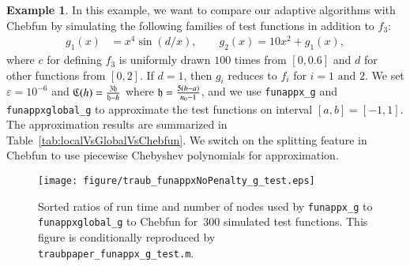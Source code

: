 \documentclass[review]{elsarticle}
\newcommand{\abstol}{\varepsilon}
\theoremstyle{definition}
\newtheorem{exmp}{Example}
\newcommand{\funappxg}{\texttt{funappx\_g}\xspace}
\newcommand{\funappxglobalg}{\texttt{funappxglobal\_g\xspace}}
\begin{document}
\begin{exmp}
In this example, we want to compare our adaptive algorithms with Chebfun by
simulating the following families of test functions in addition to $f_3$:
%
\begin{align*}
 g_1(x) &= x^4 \sin(d/x), \qquad
 g_2(x) = 10  x^2 + g_1(x),
\end{align*}
where $c$ for defining $f_3$ is uniformly drawn $100$ times from $[0,0.6]$ and
$d$ for other functions from $[0,2]$. If $d=1$, then  $g_i$ reduces to $f_i$ for
$i=1 \mbox{ and } 2$. 
We set $\abstol = 10^{-6}$ and $\mathfrak{C}
(h) = \frac{ 3 \mathfrak{h}}{\mathfrak{h}-h}$ where $\mathfrak{h} = \frac{5(b-a)}{n_0-1}$, and we use
\texttt{funappx\_g} and \texttt{funappxglobal\_g} to approximate the test
functions on interval $[a,b]=[-1,1]$. The approximation results are
summarized in Table~\ref{tab:localVsGlobalVsChebfun}. We switch on the splitting
feature in Chebfun to use piecewise Chebyshev polynomials for approximation.

%
\begin{figure}[th]
  \centering
\texttt{[image: figure/traub\_funappxNoPenalty\_g\_test.eps]}
\caption{Sorted ratios of run time and number of nodes
used by \funappxg{} to \funappxglobalg{} to Chebfun for~300 simulated test
functions. This figure is conditionally reproduced by
\texttt{traubpaper\_funappx\_g\_test.m}.}
  \label{fig:testfunctions}
\end{figure}


\end{exmp}
\end{document}
